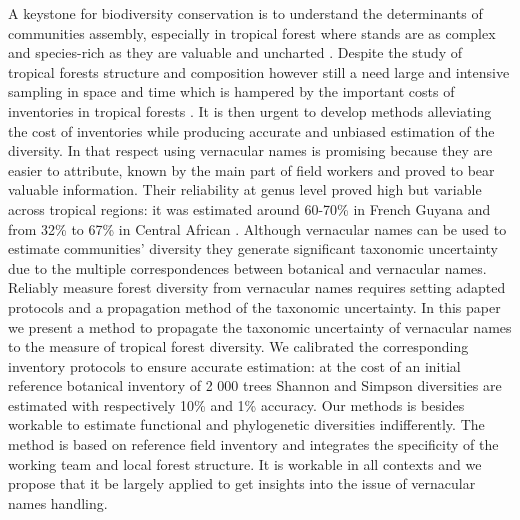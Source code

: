 \documentclass[fleqn,10pt]{ArtEcoFoG} %
\begin{document}
A keystone for biodiversity conservation is to understand the
determinants of communities assembly, especially in tropical forest
where stands are as complex and species-rich as they are valuable and
uncharted \citep{Magurran1988, Prance1994, Cardinale2012, Sist2015}.
Despite the study of tropical forests structure and composition however
still a need large and intensive sampling in space and time which is
hampered by the important costs of inventories in tropical forests
\citep{Valencia2013}. It is then urgent to develop methods alleviating
the cost of inventories while producing accurate and unbiased estimation
of the diversity. In that respect using vernacular names is promising
because they are easier to attribute, known by the main part of field
workers and proved to bear valuable information. Their reliability at
genus level proved high but variable across tropical regions: it was
estimated around 60-70\% in French Guyana \citep{Hawes2012, Guitet2014b}
and from 32\% to 67\% in Central African \citep{Rejou-Mechain2011}.
Although vernacular names can be used to estimate communities' diversity
they generate significant taxonomic uncertainty due to the multiple
correspondences between botanical and vernacular names. Reliably measure
forest diversity from vernacular names requires setting adapted
protocols and a propagation method of the taxonomic uncertainty. In this
paper we present a method to propagate the taxonomic uncertainty of
vernacular names to the measure of tropical forest diversity. We
calibrated the corresponding inventory protocols to ensure accurate
estimation: at the cost of an initial reference botanical inventory of 2
000 trees Shannon and Simpson diversities are estimated with
respectively 10\% and 1\% accuracy. Our methods is besides workable to
estimate functional and phylogenetic diversities indifferently. The
method is based on reference field inventory and integrates the
specificity of the working team and local forest structure. It is
workable in all contexts and we propose that it be largely applied to
get insights into the issue of vernacular names handling.



\makeatletter

\makeatother


\end{document}
